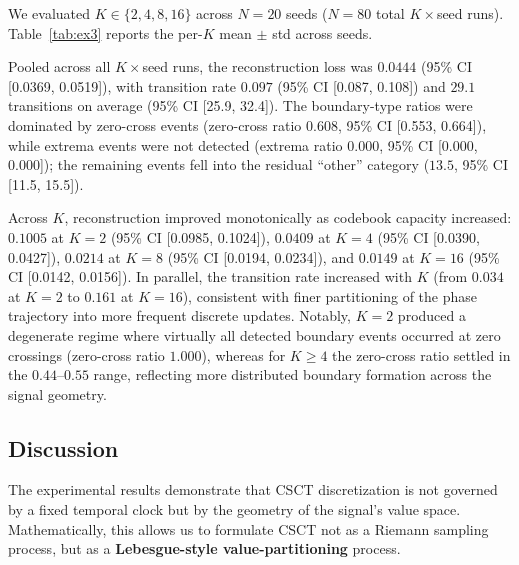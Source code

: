 \documentclass{article}
\begin{document}
We evaluated $K \in \{2, 4, 8, 16\}$ across $N=20$ seeds ($N=80$ total $K \times$seed runs).
Table~\ref{tab:ex3} reports the per-$K$ mean $\pm$ std across seeds.



Pooled across all $K \times$seed runs, the reconstruction loss was $0.0444$ (95\% CI [0.0369, 0.0519]), with transition rate $0.097$ (95\% CI [0.087, 0.108]) and $29.1$ transitions on average (95\% CI [25.9, 32.4]).
The boundary-type ratios were dominated by zero-cross events (zero-cross ratio $0.608$, 95\% CI [0.553, 0.664]), while extrema events were not detected (extrema ratio $0.000$, 95\% CI [0.000, 0.000]); the remaining events fell into the residual ``other'' category ($13.5$, 95\% CI [11.5, 15.5]).

Across $K$, reconstruction improved monotonically as codebook capacity increased:
$0.1005$ at $K=2$ (95\% CI [0.0985, 0.1024]),
$0.0409$ at $K=4$ (95\% CI [0.0390, 0.0427]),
$0.0214$ at $K=8$ (95\% CI [0.0194, 0.0234]),
and $0.0149$ at $K=16$ (95\% CI [0.0142, 0.0156]).
In parallel, the transition rate increased with $K$ (from $0.034$ at $K=2$ to $0.161$ at $K=16$), consistent with finer partitioning of the phase trajectory into more frequent discrete updates.
Notably, $K=2$ produced a degenerate regime where virtually all detected boundary events occurred at zero crossings (zero-cross ratio $1.000$), whereas for $K \ge 4$ the zero-cross ratio settled in the $0.44$--$0.55$ range, reflecting more distributed boundary formation across the signal geometry.

\subsection{Discussion}

The experimental results demonstrate that CSCT discretization is not governed by a fixed temporal clock but by the geometry of the signal's value space. Mathematically, this allows us to formulate CSCT not as a Riemann sampling process, but as a \textbf{Lebesgue-style value-partitioning} process.
\end{document}
